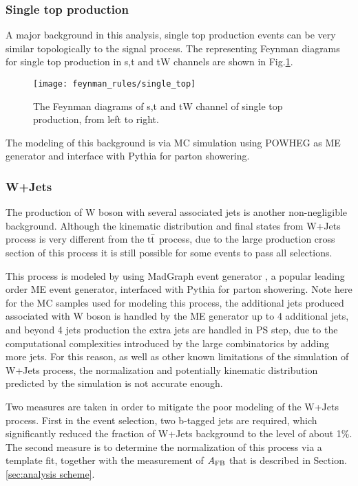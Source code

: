 \subsubsection*{Single top production}
A major background in this analysis, single top production events can be very similar topologically to the signal process. The representing Feynman diagrams for single top production in s,t and tW channels are shown in Fig.\ref{fig:singletop}.

\begin{figure}
	\centering
	\texttt{[image: feynman\_rules/single\_top]}
	\caption[Single top production feynman diagrams]{The Feynman diagrams of s,t and tW channel of single top production, from left to right.\cite{Lannon:2012fp}}
	\label{fig:singletop}
\end{figure}

The modeling of this background is via MC simulation using POWHEG as ME generator and interface with Pythia for parton showering. 

\subsubsection*{W+Jets}
The production of W boson with several associated jets is another non-negligible background. Although the kinematic distribution and final states from W+Jets process is very different from the $\mathrm{t}\bar{\mathrm{t}}$ process, due to the large production cross section of this process it is still possible for some events to pass all selections.

This process is modeled by using MadGraph event generator \cite{madgraph5}, a popular leading order ME event generator, interfaced with Pythia for parton showering. Note here for the MC samples used for modeling this process, the additional jets produced associated with W boson is handled by the ME generator up to 4 additional jets, and beyond 4 jets production the extra jets are handled in PS step, due to the computational complexities introduced by the large combinatorics by adding more jets. For this reason, as well as other known limitations of the simulation of W+Jets process, the normalization and potentially kinematic distribution predicted by the simulation is not accurate enough.   

Two measures are taken in order to mitigate the poor modeling of the W+Jets process. First in the event selection, two b-tagged jets are required, which significantly reduced the fraction of W+Jets background to the level of about 1\%. The second measure is to determine the normalization of this process via a template fit, together with the measurement of $A_{\mathrm{FB}}$ that is described in Section.\ref{sec:analysis scheme}.

